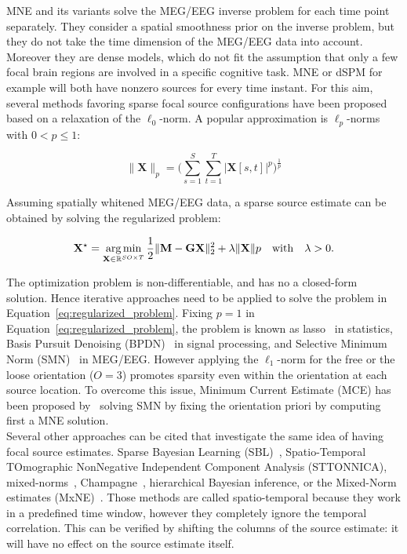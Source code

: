 MNE and its variants solve the MEG/EEG inverse problem for each time point separately. They consider a spatial smoothness prior on the inverse problem, but they do not take the time dimension of the MEG/EEG data into account. Moreover they are dense models, which do not fit the assumption that only a few focal brain regions are involved in a specific cognitive task. MNE or dSPM for example will both have nonzero sources for every time instant.
For this aim, several methods favoring sparse focal source configurations have been proposed based on a relaxation of the $\ell_0$-norm. A popular approximation is $\ell_p$-norms with $0<p\leq 1$:

\begin{equation} 
\|\mathbf{X}\|_p = \Big(\sum_{s=1}^S\sum_{t=1}^T|\mathbf{X}[s,t]|^p\Big)^{\frac{1}{p}}
\end{equation} \label{eq:lp_norms}

Assuming spatially whitened MEG/EEG data, a sparse source estimate can be obtained by solving the regularized problem:

\begin{equation}
\mathbf{X}^\star = \mathop{\mathrm{arg}\,\mathrm{min}}_{\mathbf{X}\in\mathbb{R}^{SO\times T}} \frac{1}{2}\|\mathbf{M}-\mathbf{GX}\|_2^2 + \lambda\|\mathbf{X}\|p \hspace{10pt} \mathrm{with} \hspace{10pt} \lambda > 0.
\end{equation} \label{eq:regularized_problem}

The optimization problem is non-differentiable, and has no a closed-form solution. Hence iterative approaches need to be applied to solve the problem in Equation~\eqref{eq:regularized_problem}. Fixing $p=1$ in Equation~\eqref{eq:regularized_problem}, the problem is known as \ac{lasso}~\cite{Tibshirani96} in statistics, Basis Pursuit Denoising (BPDN)~\cite{Chen_Donoho_Saunders98} in signal processing, and Selective Minimum Norm (SMN)~\cite{matsuura1995selective} in MEG/EEG. However applying the $\ell_1$-norm for the free or the loose orientation ($O=3$) promotes sparsity even within the orientation at each source location. To overcome this issue, Minimum Current Estimate (MCE) has been proposed by~\cite{Uutela-etal:1999} solving SMN by fixing the orientation priori by computing first a MNE solution. \\

Several other approaches can be cited that investigate the same idea of having focal source estimates. Sparse Bayesian Learning (SBL)~\cite{wipf2006bayesian}, Spatio-Temporal TOmographic NonNegative Independent Component Analysis (STTONNICA)\cite{valdes2009eeg}, mixed-norms~\cite{ou2009distributed}, Champagne~\cite{owen2012performance}, hierarchical Bayesian inference\cite{lucka2012hierarchical}, or the Mixed-Norm estimates (MxNE)~\cite{gramfort2012mixed}. Those methods are called spatio-temporal because they work in a predefined time window, however they completely ignore the temporal correlation. This can be verified by shifting the columns of the source estimate: it will have no effect on the source estimate itself. \\

